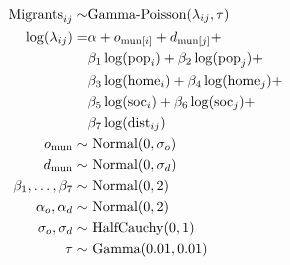 \documentclass[fleqn,10pt]{SelfArx} %
\begin{document}
        \begin{subequations}
          \begin{align} \text{Migrants}_{ij} \sim & \text{Gamma-Poisson}(\lambda_{ij}, \tau) \label{outcome}\\
            \log(\lambda_{ij}) =
            & \alpha + o_{\text{mun}[i]} + d_{\text{mun}[j]} + \notag
            \\ & \beta_1 \log(\text{pop}_i) +
            \beta_2\log(\text{pop}_j) + \notag \\ & \beta_3
            \log(\text{home}_i) + \beta_4 \log(\text{home}_j) + \notag\\
            & \beta_5 \log(\text{soc}_i) + \beta_6 \log(\text{soc}_j)
            + \notag \\ & \beta_7 \log(\text{dist}_{ij}) \label{linear} \\
            o_{\text{mun}} \sim& \text{ Normal}(0, \sigma_o) \label{muno} \\
            d_{\text{mun}} \sim& \text{ Normal}(0, \sigma_d) \label{mund} \\
            \beta_1,\ldots, \beta_7 \sim& \text{
                                          Normal}(0,2)\\ \alpha_o, \alpha_d \sim& \text{ Normal}(0,2)\\
            \sigma_o, \sigma_d \sim& \text{ HalfCauchy}(0,1) \\ \tau
            \sim& \text{ Gamma}(0.01, 0.01)
          \end{align}
          \label{model}
        \end{subequations}
\end{document}
